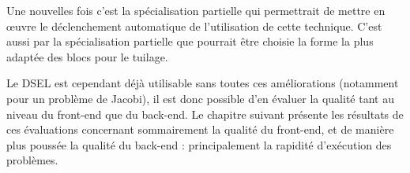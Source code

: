 Une nouvelles fois c'est la spécialisation partielle qui permettrait de mettre en œuvre le déclenchement automatique de l'utilisation de cette technique. C'est aussi par la spécialisation partielle que pourrait être choisie la forme la plus adaptée des blocs pour le tuilage. 


Le DSEL est cependant déjà utilisable sans toutes ces améliorations (notamment pour un problème de Jacobi), il est donc possible d'en évaluer la qualité tant au niveau du front-end que du back-end. Le chapitre suivant présente les résultats de ces évaluations concernant sommairement la qualité du front-end, et de manière plus poussée la qualité du back-end : principalement la rapidité d'exécution des problèmes.
